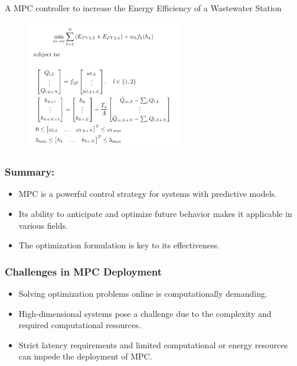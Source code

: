 \documentclass[aspectratio=169,hyperref={pdfpagelabels=false}]{beamer}
\begin{document}
\begin{frame}{\normalsize{A MPC controller to increase the Energy Efficiency of a Wastewater Station}}
  \begin{figure}
    \centering
    \includegraphics[width=0.60\textwidth]{img/mpc_formulation.png}
    \label{fig:image}
  \end{figure}
\end{frame}

  \begin{frame}
  \frametitle{Summary:}
  \begin{itemize}
      \item MPC is a powerful control strategy for systems with predictive models.
      \item Its ability to anticipate and optimize future behavior makes it applicable in various fields.
      \item The optimization formulation is key to its effectiveness.
  \end{itemize}
  \end{frame}

  \begin{frame}
    \frametitle{Challenges in MPC Deployment}
    \begin{itemize}
        \item Solving optimization problems online is computationally demanding.
        \item High-dimensional systems pose a challenge due to the complexity and required computational resources.
        \item Strict latency requirements and limited computational or energy resources can impede the deployment of MPC.
    \end{itemize}
    \let\thefootnote\relax{}
    \end{frame}
\end{document}
